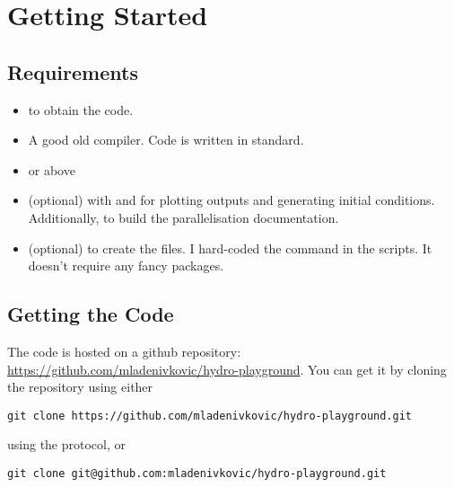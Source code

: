 \newpage
\section{Getting Started}


\subsection{Requirements}

\begin{itemize}
\item   {} to obtain the code.
\item   A good old  compiler. Code is written in 
        standard.
\item   {} or above
\item   (optional)  with  and
         for plotting outputs and generating initial
        conditions. Additionally,  to build the
        parallelisation documentation.
\item   (optional)  to create the  files. I
        hard-coded the  command in the scripts. It doesn't
        require any fancy  packages.
\end{itemize}





\subsection{Getting the Code}


The code is hosted on a github repository:
\url{https://github.com/mladenivkovic/hydro-playground}. You can get it by
cloning the repository using either

\begin{lstlisting}
git clone https://github.com/mladenivkovic/hydro-playground.git
\end{lstlisting}


using the  protocol, or

\begin{lstlisting}
git clone git@github.com:mladenivkovic/hydro-playground.git
\end{lstlisting}

